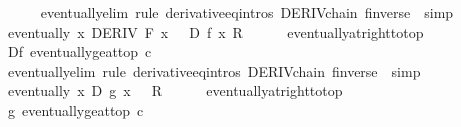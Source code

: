 \begin{isabellebody}
\ \ \ \ \isamarkupfalse%
\ eventually{\isacharunderscore}{\kern0pt}elim\ {\isacharparenleft}{\kern0pt}rule\ derivative{\isacharunderscore}{\kern0pt}eq{\isacharunderscore}{\kern0pt}intros\ DERIV{\isacharunderscore}{\kern0pt}chain{\isacharprime}{\kern0pt}{\isacharbrackleft}{\kern0pt}\ f{\isacharequal}{\kern0pt}inverse{\isacharbrackright}{\kern0pt}\ {\isacharbar}{\kern0pt}\ simp{\isacharparenright}{\kern0pt}{\isacharplus}{\kern0pt}\isanewline
\ \ \isamarkupfalse%
\ {\isachardoublequoteopen}eventually\ {\isacharparenleft}{\kern0pt}{\isasymlambda}x{\isachardot}{\kern0pt}\ DERIV\ {\isacharquery}{\kern0pt}F\ x\ \ {\isacharcolon}{\kern0pt}{\isachargreater}{\kern0pt}\ {\isacharquery}{\kern0pt}D\ f{\isacharprime}{\kern0pt}\ x{\isacharparenright}{\kern0pt}\ {\isacharquery}{\kern0pt}R{\isachardoublequoteclose}\isanewline
\ \ \ \ \isamarkupfalse%
\ eventually{\isacharunderscore}{\kern0pt}at{\isacharunderscore}{\kern0pt}right{\isacharunderscore}{\kern0pt}to{\isacharunderscore}{\kern0pt}top\isanewline
\ \ \ \ \isamarkupfalse%
\ Df\ eventually{\isacharunderscore}{\kern0pt}ge{\isacharunderscore}{\kern0pt}at{\isacharunderscore}{\kern0pt}top{\isacharbrackleft}{\kern0pt}\ c{\isacharequal}{\kern0pt}{}{\isacharbrackright}{\kern0pt}\isanewline
\ \ \ \ \isamarkupfalse%
\ eventually{\isacharunderscore}{\kern0pt}elim\ {\isacharparenleft}{\kern0pt}rule\ derivative{\isacharunderscore}{\kern0pt}eq{\isacharunderscore}{\kern0pt}intros\ DERIV{\isacharunderscore}{\kern0pt}chain{\isacharprime}{\kern0pt}{\isacharbrackleft}{\kern0pt}\ f{\isacharequal}{\kern0pt}inverse{\isacharbrackright}{\kern0pt}\ {\isacharbar}{\kern0pt}\ simp{\isacharparenright}{\kern0pt}{\isacharplus}{\kern0pt}\isanewline
\ \ \isamarkupfalse%
\ {\isachardoublequoteopen}eventually\ {\isacharparenleft}{\kern0pt}{\isasymlambda}x{\isachardot}{\kern0pt}\ {\isacharquery}{\kern0pt}D\ g{\isacharprime}{\kern0pt}\ x\ {\isasymnoteq}\ {}{\isacharparenright}{\kern0pt}\ {\isacharquery}{\kern0pt}R{\isachardoublequoteclose}\isanewline
\ \ \ \ \isamarkupfalse%
\ eventually{\isacharunderscore}{\kern0pt}at{\isacharunderscore}{\kern0pt}right{\isacharunderscore}{\kern0pt}to{\isacharunderscore}{\kern0pt}top\isanewline
\ \ \ \ \isamarkupfalse%
\ g{\isacharprime}{\kern0pt}\ eventually{\isacharunderscore}{\kern0pt}ge{\isacharunderscore}{\kern0pt}at{\isacharunderscore}{\kern0pt}top{\isacharbrackleft}{\kern0pt}\ c{\isacharequal}{\kern0pt}{}{\isacharbrackright}{\kern0pt}\isanewline

\end{isabellebody}
